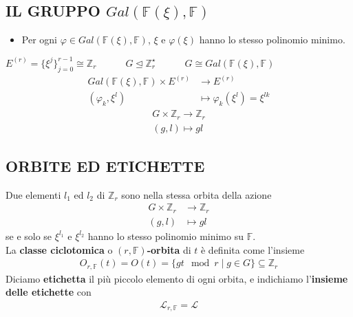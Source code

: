 \documentclass[mathserif]{beamer}
\begin{document}
\subsection{IL GRUPPO $Gal(\mathbb{F}(\xi), \mathbb{F})$}
\begin{frame}
\begin{itemize}
   \item Per ogni $\varphi \in Gal(\mathbb{F}(\xi), \mathbb{F})$, $\xi$ e $\varphi(\xi)$ hanno lo stesso
      polinomio minimo.
\end{itemize}

\vspace{0.5cm}

   $E^{(r)} = \lbrace \xi^{j}\rbrace_{j=0}^{r-1}\cong \mathbb{Z}_{r}  
   \qquad \quad
   G \trianglelefteq \mathbb{Z}_{r}^{\star} 
   \qquad  \quad 
   G \cong Gal(\mathbb{F}(\xi), \mathbb{F})$
   \vspace{0.5cm}
   \begin{align*}
	Gal(\mathbb{F}(\xi), \mathbb{F}) \times E^{(r)}  & \longrightarrow  E^{(r)}   \\
		  (\varphi_{k},\xi^{l}) & \longmapsto \varphi_{k}(\xi^{l}) = \xi^{lk} 
    \end{align*}
    \begin{align*}	  
	G \times \mathbb{Z}_{r} \longrightarrow  \mathbb{Z}_{r}   \\
		  (g,l) \longmapsto gl
    \end{align*}
\end{frame}

\subsection{ORBITE ED ETICHETTE}
\begin{frame}
       Due elementi $l_{1}$ ed $l_{2}$ di $\mathbb{Z}_{r}$ sono nella stessa orbita della azione 
	\begin{align*}
	G \times \mathbb{Z}_{r} &\longrightarrow  \mathbb{Z}_{r}   \\
		  (g,l) &\longmapsto gl
	\end{align*}
	se e solo se $\xi^{l_{1}}$ e $\xi^{l_{2}}$ hanno lo stesso polinomio minimo su $\mathbb{F}$.\\
        La {\bf classe ciclotomica} o {\bf $(r,\mathbb{F})$-orbita} di $t$ è definita come l'insieme
	\begin{align*}
	  O_{r,\mathbb{F}}(t) = O(t) = \lbrace gt \mod{r} \mid g \in G \rbrace \subseteq  \mathbb{Z}_{r}
	\end{align*}
	Diciamo {\bf etichetta} il più piccolo elemento di ogni orbita, e indichiamo l'{\bf insieme delle etichette} con
	\begin{align*}
	   \mathscr{L}_{r,\mathbb{F}} = \mathscr{L}
	\end{align*}
\end{frame}
\end{document}
